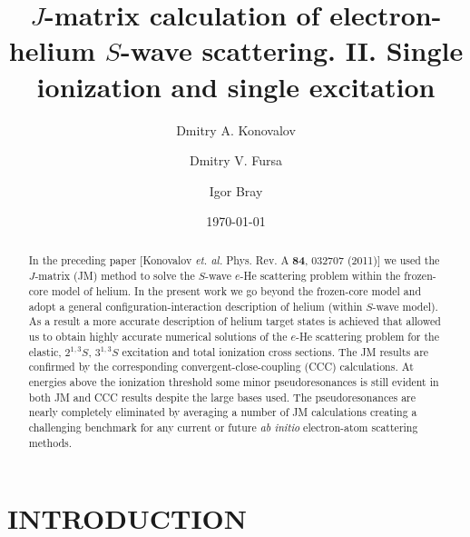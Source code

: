 \documentclass[aip
, pra
, showpacs
, aps
, twocolumn
, groupedaddress
, floatfix
]{revtex4}
\begin{document}
\title {$J$-matrix calculation of electron-helium $S$-wave scattering. II. Single ionization and single excitation}

\author{Dmitry A. Konovalov}

\author{Dmitry V. Fursa}

\author{Igor Bray}



\date{\today}

\begin{abstract}
In the preceding paper  [Konovalov {\em et. al.} Phys. Rev. A {\bf 84}, 032707 (2011)] we used
the $J$-matrix (JM) method to solve  the $S$-wave $e$-He scattering problem within the frozen-core model of helium.
In the present work we go beyond the frozen-core model and adopt a general configuration-interaction description of helium (within $S$-wave model).
As a result a more accurate description of helium target states is achieved that allowed us to obtain highly
accurate numerical solutions of the $e$-He scattering problem
for the elastic, $2^{1,3}S$, $3^{1,3}S$ excitation and total ionization cross sections.
The JM results are confirmed by the corresponding convergent-close-coupling (CCC) calculations. 
At energies above the ionization threshold some minor pseudoresonances is still evident in both JM and CCC results despite the large bases used.
The pseudoresonances are nearly completely eliminated by averaging a number of JM calculations creating a challenging benchmark
for any current or future {\it ab initio} electron-atom scattering methods.



\end{abstract}

\maketitle



\section{INTRODUCTION}
\end{document}
